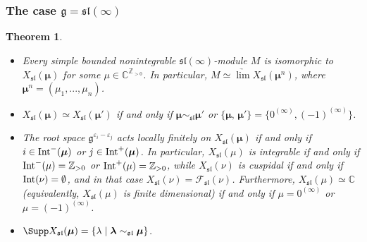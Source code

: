\documentclass[12pt]{amsart}
\newcommand{\C}{{\mathbb C}}
\newcommand{\Z}{{\mathbb Z}}
\def\gg{\mathfrak{g}}
\def\Z{\mathbb{Z}}
\newtheorem{thm}{Theorem}[section]
\begin{document}
\subsubsection{The case  $\gg = \mathfrak{sl} (\infty)$}
\begin{thm} \label{thm-bounded-infinite-sl}

\begin{itemize} 
\item[(i)]  Every simple bounded nonintegrable $\mathfrak{sl} (\infty)$-module $M$ is isomorphic  to $X_{\mathfrak{sl}}(\boldsymbol{\mu})$ for some $\mu \in \C^{{\mathbb Z}_{>0}}$. In particular,  $M\simeq  \underrightarrow\lim X_{\mathfrak{sl}}(\boldsymbol{\mu}^n)$, where $\boldsymbol{\mu}^n = (\mu_1,...,\mu_n)$.


\item[(ii)] 
$X_{\mathfrak{sl}}(\boldsymbol{\mu}) \simeq X_{\mathfrak{sl}}(\boldsymbol{\mu}')$  if and only if $\boldsymbol{\mu} \sim_{\mathfrak{sl}} \boldsymbol{\mu'}$ or $\{\boldsymbol{\mu}, \, \boldsymbol{\mu}' \} = \{ 0^{(\infty)}, (-1)^{(\infty)}\}$. 

\item[(iii)]  The root space $\gg^{\varepsilon_i - \varepsilon_j}$ acts locally finitely on $X_{\mathfrak{sl}}(\boldsymbol{\mu})$ if and only if $i \in {\rm Int}^- (\boldsymbol{\mu})$ or $j \in {\rm Int}^+ (\boldsymbol{\mu})$.  In particular, $X_{\mathfrak{sl}}(\mu)$ is integrable if and only if ${\rm Int}^- (\mu) = \Z_{>0}$ or ${\rm Int}^+ (\mu) =  \Z_{>0}$, while  $X_{\mathfrak{sl}}(\nu)$ is cuspidal if and only if $ {\rm Int} (\nu) = \emptyset$, and in that case $X_{\mathfrak{sl}}(\nu) = {\mathcal F}_{\mathfrak{sl}} (\nu)$. Furthermore, $X_{\mathfrak{sl}}(\mu) \simeq \C$ (equivalently, $X_{\mathfrak{sl}}(\mu)$ is finite dimensional) if and only if $\mu  = 0^{(\infty)}$ or  $\mu  = (-1)^{(\infty)}$.

\item[(iv)] $\Supp X_{\mathfrak{sl}}(\boldsymbol{\mu}) = \{\lambda \; | \; \boldsymbol{\lambda} \sim_{\mathfrak{sl}}  \boldsymbol{\mu} \}$.
\end{itemize}
\end{thm}
\end{document}
